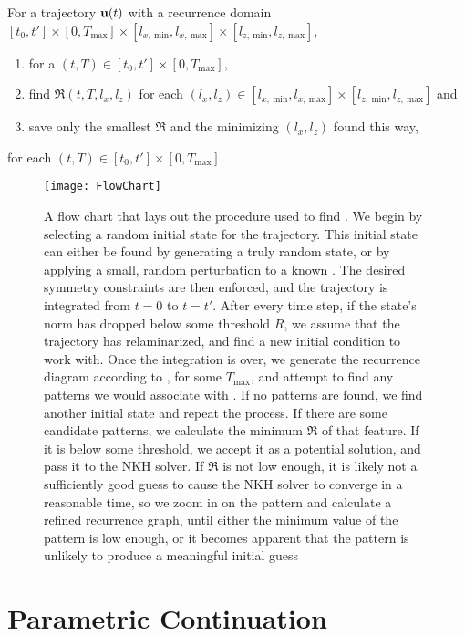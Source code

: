 \begin{algorithm}\label{alg:recBroke}
For a trajectory $\mathbf{u}(t)$ with a recurrence domain   $[t_0,t']\times [0,T_{\textrm{max}}] \times [l_{x,~\textrm{min}},l_{x,~\textrm{max}}] \times [l_{z,~\textrm{min}},l_{z,~\textrm{max}}]$, 
\begin{enumerate}
\item for a $(t,T) \in [t_0,t']\times [0,T_{\textrm{max}}]$, 
\item find $\mathfrak{R}(t,T,l_x,l_z)$ for each $(l_x,l_z) \in  [l_{x,~\textrm{min}},l_{x,~\textrm{max}}] \times [l_{z,~\textrm{min}},l_{z,~\textrm{max}}]$ and 
\item save only the smallest $\mathfrak{R}$ and the minimizing $(l_x,l_z)$ found this way,   
\end{enumerate}
 for each $(t,T) \in [t_0,t']\times [0,T_{\textrm{max}}]$.
\end{algorithm}

\begin{figure}[h!]
\texttt{[image: FlowChart]}
\caption{A flow chart that lays out the procedure used to find \ecs. We begin by selecting a random initial state for the trajectory. This initial state can either be found by generating a truly random state, or by applying a small, random perturbation to a known \ecs. The desired symmetry constraints are then enforced, and the trajectory is integrated from $t = 0$ to $t=t'$. After every time step, if the state's norm has dropped below some threshold $R$, we assume that the trajectory has relaminarized, and find a new initial condition to work with. Once the integration is over, we generate the recurrence diagram according to , for some $T_{\textrm{max}}$, and attempt to find any patterns we would associate with \ecs. If no patterns are found, we find another initial state and repeat the process. If there are some candidate patterns, we calculate the minimum $\mathfrak{R}$ of that feature. If it is below some threshold, we accept it as a potential solution, and pass it to the NKH solver. If $\mathfrak{R}$ is not low enough, it is likely not a sufficiently good guess to cause the NKH solver to converge in a reasonable time, so we zoom in on the pattern and calculate a refined recurrence graph, until either the minimum value of the pattern is low enough, or it becomes apparent that the pattern is unlikely to produce a meaningful initial guess}\label{fig:FlowChart} 
\end{figure}
 \clearpage
 \section{Parametric Continuation} 
 

